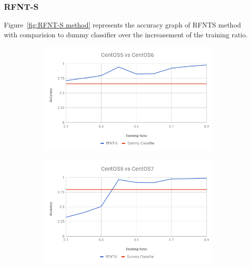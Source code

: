 \documentclass[10pt, conference, compsocconf]{IEEEtran}
\begin{document}
\subsubsection{RFNT-S}
Figure~\ref{fig:RFNT-S method} represents
the accuracy graph of RFNTS method with comparision to dummy
classifier over the increasement of the training ratio.
\begin{figure}[h!]
        \centering
        \begin{subfigure}[b]{0.8\linewidth}
                \includegraphics[width=\columnwidth]{figures/ALS/RFNT-S-ALS-5vs6-PFS}
        \end{subfigure}
        \begin{subfigure}[b]{0.8\linewidth}
                \includegraphics[width=\columnwidth]{figures/ALS/RFNT-S-ALS-5vs7-PFS}
        \end{subfigure}
        \begin{subfigure}[b]{0.8\linewidth}

\end{subfigure}
\end{figure}
\end{document}
